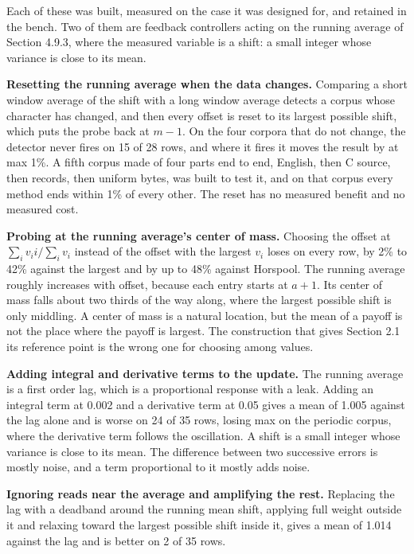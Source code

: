 Each of these was built, measured on the case it was designed for, and retained in the bench. Two of them are feedback controllers acting on the running average of Section 4.9.3, where the measured variable is a shift: a small integer whose variance is close to its mean.

\noindent\textbf{Resetting the running average when the data changes.} Comparing a short window average of the shift with a long window average detects a corpus whose character has changed, and then every offset is reset to its largest possible shift, which puts the probe back at \(m-1\). On the four corpora that do not change, the detector never fires on 15 of 28 rows, and where it fires it moves the result by at max 1\%. A fifth corpus made of four parts end to end, English, then C source, then records, then uniform bytes, was built to test it, and on that corpus every method ends within 1\% of every other. The reset has no measured benefit and no measured cost.

\noindent\textbf{Probing at the running average's center of mass.} Choosing the offset at \(\sum_i v_i i / \sum_i v_i\) instead of the offset with the largest \(v_i\) loses on every row, by 2\% to 42\% against the largest and by up to 48\% against Horspool. The running average roughly increases with offset, because each entry starts at \(a+1\). Its center of mass falls about two thirds of the way along, where the largest possible shift is only middling. A center of mass is a natural location, but the mean of a payoff is not the place where the payoff is largest. The construction that gives Section 2.1 its reference point is the wrong one for choosing among values.

\noindent\textbf{Adding integral and derivative terms to the update.} The running average is a first order lag, which is a proportional response with a leak. Adding an integral term at 0.002 and a derivative term at 0.05 gives a mean of 1.005 against the lag alone and is worse on 24 of 35 rows, losing max on the periodic corpus, where the derivative term follows the oscillation. A shift is a small integer whose variance is close to its mean. The difference between two successive errors is mostly noise, and a term proportional to it mostly adds noise.

\noindent\textbf{Ignoring reads near the average and amplifying the rest.} Replacing the lag with a deadband around the running mean shift, applying full weight outside it and relaxing toward the largest possible shift inside it, gives a mean of 1.014 against the lag and is better on 2 of 35 rows.

